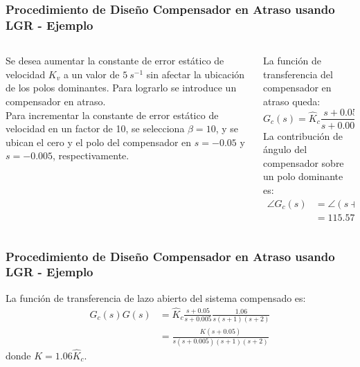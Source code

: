 \documentclass[aspectratio=169,handout]{beamer}
\theoremstyle{definition}
\theoremstyle{plain}
\theoremstyle{remark}
\begin{document}
\begin{frame}[c]\frametitle{Procedimiento de Diseño Compensador en Atraso usando LGR - Ejemplo}
\begin{columns}
	\begin{column}{0.5\textwidth}
		Se desea aumentar la constante de error estático de velocidad $K_v$ a un valor de $5\ s^{-1}$ sin afectar la ubicación de los polos dominantes. Para lograrlo se introduce un compensador en atraso.\\
		\vspace*{3mm}
		\pause
		Para incrementar la constante de error estático de velocidad en un factor de 10, se selecciona $\beta = 10$, y se ubican el cero y el polo del compensador en $s=-0.05$ y $s=-0.005$, respectivamente.
		\pause
	\end{column}
	\begin{column}{0.5\textwidth}
		La función de transferencia del compensador en atraso queda:
		\begin{equation*}
			G_c(s) = \hat{K}_c \frac{s+0.05}{s+0.005}
		\end{equation*}
		\pause
		La contribución de ángulo del compensador sobre un polo dominante es:
		\begin{align*}
			\angle G_c(s) &= \angle(s+0.05) - \angle(s+0.005)\\
			&= \ang{115.5797} - \ang{119.0488} = -\ang{3.4691}
		\end{align*}
	\end{column}
\end{columns}
\end{frame}

\begin{frame}[c]\frametitle{Procedimiento de Diseño Compensador en Atraso usando LGR - Ejemplo}
La función de transferencia de lazo abierto del sistema compensado es:
\begin{align*}
	G_c(s)G(s) &= \hat{K}_c \frac{s+0.05}{s+0.005} \frac{1.06}{s(s+1)(s+2)}\\
	&= \frac{K(s+0.05)}{s(s+0.005)(s+1)(s+2)}
\end{align*}
donde $K = 1.06 \hat{K}_c$.
\end{frame}
\end{document}
